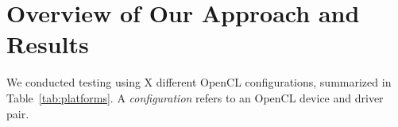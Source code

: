 \section{Overview of Our Approach and Results}\label{sec:overview}

We conducted testing using X different OpenCL configurations, summarized in Table~\ref{tab:platforms}. A \emph{configuration} refers to an OpenCL device and driver pair.
